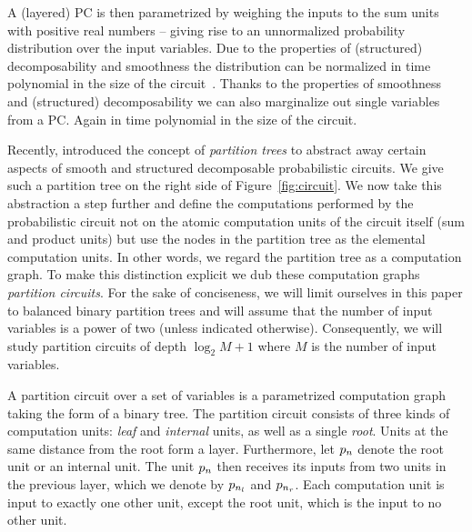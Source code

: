 A (layered) PC is then parametrized by weighing the inputs to the sum units with positive real numbers -- giving rise to an unnormalized probability distribution over the input variables. Due to the properties of (structured) decomposability and smoothness the distribution can be normalized in time polynomial in the size of the circuit~\citep{peharz2015theoretical}.
Thanks to the properties of smoothness and (structured) decomposability we can also marginalize out single variables from a PC. Again in time polynomial in the size of the circuit.









Recently, \citet{zuidberg2024probabilistic} introduced the concept of \textit{partition trees} to abstract away certain aspects of smooth and structured decomposable probabilistic circuits. We give such a partition tree on the right side of Figure~\ref{fig:circuit}. We now take this abstraction a step further and define the computations performed by the probabilistic circuit not on the atomic computation units of the circuit itself (\ie sum and product units) but use the nodes in the partition tree as the elemental computation units. In other words, we regard the partition tree as a computation graph. To make this distinction explicit we dub these computation graphs \textit{partition circuits}. For the sake of conciseness, we will limit ourselves in this paper to balanced binary partition trees and will assume that the number of input variables is a power of two (unless indicated otherwise). Consequently, we will study partition circuits of depth $\log_2 M+1$ where $M$ is the number of input variables.



\begin{definition}
	\label{def:partition_circuit}
	A partition circuit over a set of variables is a parametrized computation graph taking the form of a binary tree. The partition circuit consists of three kinds of computation units:
	\textit{leaf} and \textit{internal} units, as well as a single \textit{root}.
	Units at the same distance from the root form a layer.
	Furthermore, let $p_n$ denote the root unit or an internal unit. The unit $p_n$ then receives its inputs from two units in the previous layer, which we denote by $p_{n_l}$ and $p_{n_r}$. Each computation unit is input to exactly one other unit, except the root unit, which is the input to no other unit.
\end{definition}




